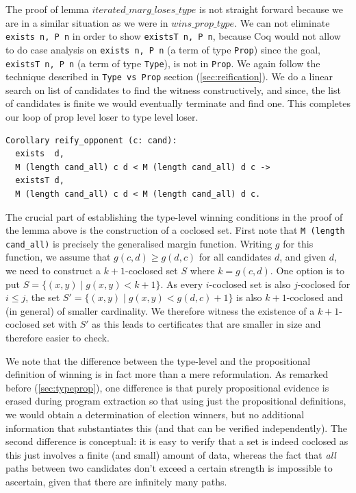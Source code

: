 The proof of lemma  $iterated\_marg\_loses\_type$ is not straight forward because
we are in a similar situation  as we were in $wins\_prop\_type$. 
We can not eliminate \texttt{exists n, P n} in order to show \texttt{existsT n, P n},
because Coq would not allow to do case analysis on \texttt{exists n, P n} (a term of 
type \texttt{Prop}) since the goal, \texttt{existsT n, P n} (a term of type \texttt{Type}), is not in
\texttt{Prop}. We again follow the technique described in 
\texttt{Type vs Prop} section (\ref{sec:reification}).
We do  a linear search on list of candidates  to find the witness constructively, and since, 
the list of candidates is  finite we would eventually terminate and find one.  
This completes our loop of prop level loser to type level loser. 


\begin{verbatim}
Corollary reify_opponent (c: cand):
  exists  d, 
  M (length cand_all) c d < M (length cand_all) d c ->
  existsT d, 
  M (length cand_all) c d < M (length cand_all) d c.
\end{verbatim}



\noindent
The crucial part of establishing the type-level winning conditions
in the proof of the lemma above is the construction of a coclosed set. 
First note that \texttt{M (length cand\_all)} is precisely
the generalised margin function. Writing $g$ for this function, we
assume that $g(c, d) \geq g(d, c)$ for all candidates $d$, and given
$d$, we need to construct a $k+1$-coclosed set $S$ where $k = g(c, d)$.
One option is to put
$S = \lbrace (x, y) \mid g(x, y) < k+1 \rbrace$. As every
$i$-coclosed set is also $j$-coclosed for $i \leq j$, the set $S' =
\lbrace (x, y) \mid g(x, y) < g(d, c) + 1 \rbrace$ is also
$k+1$-coclosed and (in general) of smaller cardinality. We therefore
witness the existence of a $k+1$-coclosed set with $S'$ as this
leads to certificates that are smaller in size and therefore easier
to check.

We note that the difference between the type-level and the
propositional definition of winning 
is in fact more than a mere reformulation. As remarked before (\ref{sec:typeprop}), one
difference is that purely propositional evidence is erased during
program extraction so that using just the propositional definitions,
we would obtain a determination of election winners, but no
additional information that substantiates this (and that can be
verified independently). The second difference is conceptual: it is
easy to verify that a set is indeed coclosed as this just involves a
finite (and small) amount of data, whereas the fact that \emph{all} paths
between two candidates don't exceed a certain strength is impossible
to ascertain, given that there are infinitely many paths.

